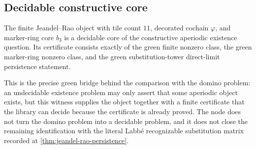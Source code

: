 \subsection{Decidable constructive core}

\begin{theorem}\label{thm:jeandel-rao-decidable-core}
  \leanok
The finite Jeandel--Rao object with tile count \(11\), decorated cochain
\(\varphi\), and marker-ring core \(b_3\) is a decidable core of the
constructive aperiodic existence question.  Its certificate consists exactly of
the green finite nonzero class, the green marker-ring nonzero class, and the
green substitution-tower direct-limit persistence statement.

This is the precise green bridge behind the comparison with the domino problem:
an undecidable existence problem may only assert that some aperiodic object
exists, but this witness supplies the object together with a finite certificate
that the library can decide because the certificate is already proved.  The
node does not turn the domino problem into a decidable problem, and it does not
close the remaining identification with the literal Labb\'e recognizable
substitution matrix recorded at \cref{thm:jeandel-rao-persistence}.
\end{theorem}
